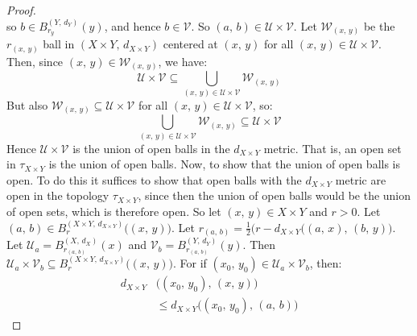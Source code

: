 \documentclass{article}
\theoremstyle{plain}
\theoremstyle{normal}
\begin{document}
\begin{proof}
\begin{equation}
            \end{equation}
            so $b\in{B}_{r_{y}}^{(Y,\,d_{Y})}(y)$, and hence
            $b\in\mathcal{V}$. So
            $(a,\,b)\in\mathcal{U}\times\mathcal{V}$. Let
            $\mathcal{W}_{(x,\,y)}$ be the $r_{(x,\,y)}$ ball in
            $(X\times{Y},\,d_{X\times{Y}})$ centered at $(x,\,y)$ for all
            $(x,\,y)\in\mathcal{U}\times\mathcal{V}$. Then, since
            $(x,\,y)\in\mathcal{W}_{(x,\,y)}$, we have:
            \begin{equation}
                \mathcal{U}\times\mathcal{V}
                \subseteq
                \bigcup_{(x,\,y)\in\mathcal{U}\times\mathcal{V}}
                    \mathcal{W}_{(x,\,y)}
            \end{equation}
            But also
            $\mathcal{W}_{(x,\,y)}\subseteq\mathcal{U}\times\mathcal{V}$
            for all $(x,\,y)\in\mathcal{U}\times\mathcal{V}$, so:
            \begin{equation}
                \bigcup_{(x,\,y)\in\mathcal{U}\times\mathcal{V}}
                    \mathcal{W}_{(x,\,y)}
                \subseteq
                \mathcal{U}\times\mathcal{V}
            \end{equation}
            Hence $\mathcal{U}\times\mathcal{V}$ is the union of open balls
            in the $d_{X\times{Y}}$ metric. That is, an open set in
            $\tau_{X\times{Y}}$ is the union of open balls. Now, to show that
            the union of open balls is open. To do this it suffices to show
            that open balls with the $d_{X\times{Y}}$ metric are open in
            the topology $\tau_{X\times{Y}}$, since then the union of open
            balls would be the union of open sets, which is therefore open.
            So let $(x,\,y)\in{X}\times{Y}$ and $r>0$. Let
            $(a,\,b)\in{B}_{r}^{(X\times{Y},\,d_{X\times{Y}})}\big((x,\,y)\big)$.
            Let $r_{(a,\,b)}=\frac{1}{2}\big(r-d_{X\times{Y}}\big((a,\,x),\,(b,\,y)\big)$.
            Let $\mathcal{U}_{a}=B_{r_{(a,\,b)}}^{(X,\,d_{X})}(x)$ and
            $\mathcal{V}_{b}=B_{r_{(a,\,b)}}^{(Y,\,d_{Y})}(y)$. Then
            $\mathcal{U}_{a}\times\mathcal{V}_{b}\subseteq{B}_{r}^{(X\times{Y},\,d_{X\times{Y}})}\big((x,\,y)\big)$.
            For if $(x_{0},\,y_{0})\in\mathcal{U}_{a}\times\mathcal{V}_{b}$,
            then:
            \begin{align}
                d_{X\times{Y}}&\big((x_{0},\,y_{0}),\,(x,\,y)\big)
                \nonumber\\
                &\leq{d}_{X\times{Y}}\big((x_{0},\,y_{0}),\,(a,\,b)\big)

\end{align}
\end{proof}
\end{document}
